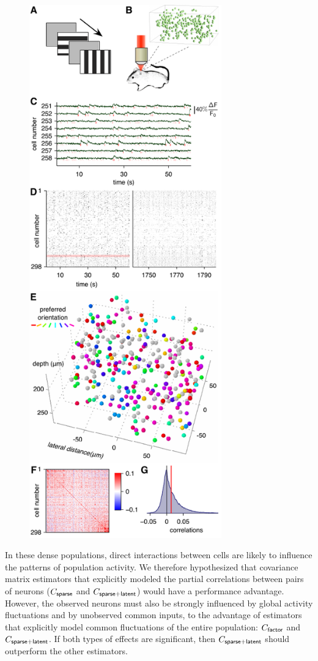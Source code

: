 \documentclass[10pt]{article}
\begin{document}
\begin{figure}
    {\includegraphics[width=8.3cm]{figures/Figure02.pdf}}
\end{figure}

In these dense populations, direct interactions between cells are likely to influence the patterns of population activity.  We therefore hypothesized that covariance matrix estimators that explicitly modeled the partial correlations between pairs of neurons ($C_{\sf sparse}$ and $C_{\sf sparse+latent}$) would have a performance advantage.  However, the observed neurons must also be strongly influenced by global activity fluctuations and by unobserved common inputs, to the advantage of estimators that explicitly model common fluctuations of the entire population: $C_{\sf factor}$ and $C_{\sf sparse+latent}$.  If both types of effects are significant, then $C_{\sf sparse+latent}$ should outperform the other estimators.
\end{document}
